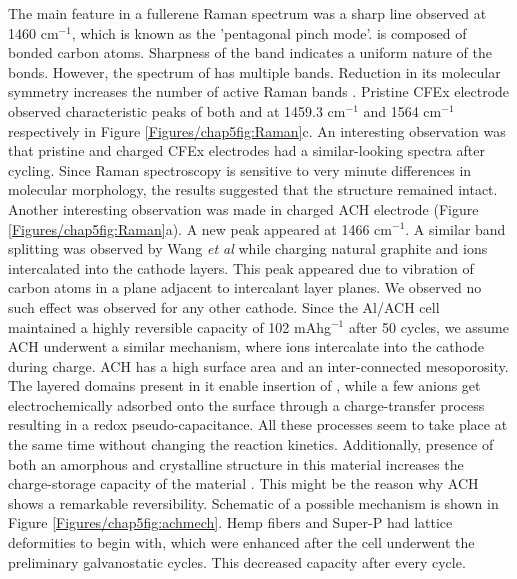 The main feature in a fullerene Raman spectrum was a sharp line observed at 1460 cm$^{-1}$, which is known as the 'pentagonal pinch mode'.  is composed of  bonded carbon atoms. Sharpness of the band indicates a uniform nature of the bonds. However, the spectrum of  has multiple bands. Reduction in its molecular symmetry increases the number of active Raman bands \cite{}. Pristine CFEx electrode observed characteristic peaks of both  and  at 1459.3 cm$^{-1}$ and 1564 cm$^{-1}$ respectively in Figure \ref{Figures/chap5fig:Raman}c. An interesting observation was that pristine and charged CFEx electrodes had a similar-looking spectra after cycling. Since Raman spectroscopy is sensitive to very minute differences in molecular morphology, the results suggested that the structure remained intact. Another interesting observation was made in charged ACH electrode (Figure \ref{Figures/chap5fig:Raman}a). A new peak appeared at 1466 cm$^{-1}$. A similar band splitting was observed by Wang \textit{et al} \cite{wang_kish_2017} while charging natural graphite and  ions intercalated into the cathode layers. This peak appeared due to vibration of carbon atoms in a plane adjacent to intercalant layer planes. We observed no such effect was observed for any other cathode. Since the Al/ACH cell maintained a highly reversible capacity of 102 mAhg$^{-1}$ after 50 cycles, we assume ACH underwent a similar mechanism, where  ions intercalate into the cathode during charge. ACH has a high surface area and an inter-connected mesoporosity. The layered domains present in it enable insertion of , while a few anions get electrochemically adsorbed onto the surface through a charge-transfer process resulting in a redox pseudo-capacitance. All these processes seem to take place at the same time without changing the reaction kinetics. Additionally, presence of both an amorphous and crystalline structure in this material increases the charge-storage capacity of the material \cite{brezesinski_ordered_2010}. This might be the reason why ACH shows a remarkable reversibility. Schematic of a possible mechanism is shown in Figure \ref{Figures/chap5fig:achmech}. Hemp fibers and Super-P had lattice deformities to begin with, which were enhanced after the cell underwent the preliminary galvanostatic cycles. This decreased capacity after every cycle. 
